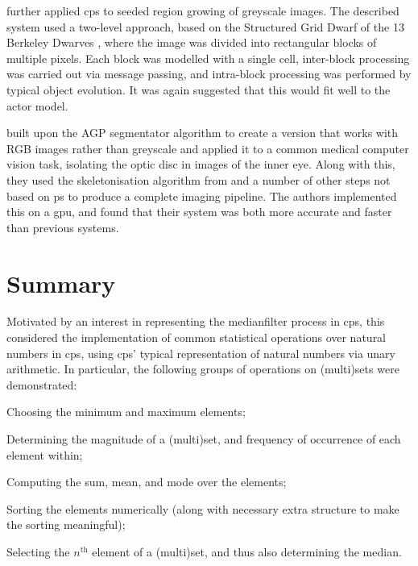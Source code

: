 \citeauthor{Nicolescu2015} \cite{Nicolescu2015} further applied \gls{cps} to seeded region growing of greyscale images.  The described system used a two-level approach, based on the \textsf{Structured Grid Dwarf} of the 13 Berkeley Dwarves \cite{Asanovic2006}, where the image was divided into rectangular blocks of multiple pixels.  Each block was modelled with a single cell, inter-block processing was carried out via message passing, and intra-block processing was performed by typical object evolution.  It was again suggested that this would fit well to the \gls{actor} model.

\citeauthor{Diaz-Pernil2016} \cite{Diaz-Pernil2016} built upon the AGP segmentator algorithm to create a version that works with RGB images rather than greyscale and applied it to a common medical computer vision task, isolating the optic disc in images of the inner eye.  Along with this, they used the skeletonisation algorithm from \cite{Diaz-Pernil2013a} and a number of other steps not based on \gls{ps} to produce a complete imaging pipeline.  The authors implemented this on a \gls{gpu}, and found that their system was both more accurate and faster than previous systems.





\section{Summary}

Motivated by an interest in representing the \gls{medianfilter} process in \gls{cps}, this  considered the implementation of common statistical operations over natural numbers in \gls{cps}, using \gls{cps}' typical representation of natural numbers via unary arithmetic.  In particular, the following groups of operations on (multi)sets were demonstrated:
\begin{inparaenum}[(i)]
\item Choosing the minimum and maximum elements;
\item Determining the magnitude of a (multi)set, and frequency of occurrence of each element within;
\item Computing the sum, mean, and mode over the elements;
\item Sorting the elements numerically (along with necessary extra structure to make the sorting meaningful);
\item Selecting the \(n^\text{th}\) element of a (multi)set, and thus also determining the median.
\end{inparaenum}

